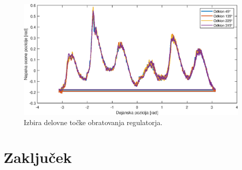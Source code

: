 \documentclass[a4paper,twoside,openright,12pt,slovene]{book}
\begin{document}
\begin{figure}[!htbp]
    \centering
    \includegraphics[width=0.75\columnwidth]{Slike/izbiraStabilneTocke.eps}
    \caption{\label{izbiraStabilneTocke} Izbira delovne točke obratovanja regulatorja. }
\end{figure}

\chapter{Zaključek} \label{zakljucek}


\cleardoublepage{} %






\end{document}
